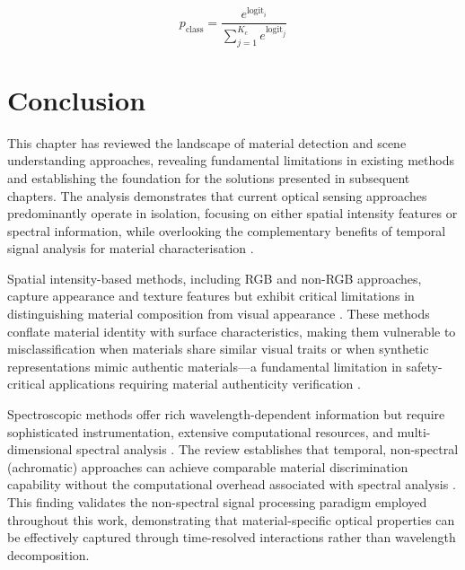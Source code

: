 \documentclass[12pt,a4paper,oneside]{report}
\let\oldsection\section
\renewcommand{\section}{\clearpage\oldsection}
\begin{document}
\begin{equation}
\label{eq:softmax}
p_{\text{class}} = \frac{e^{\text{logit}_{i}}}{\sum_{j=1}^{K_c} e^{\text{logit}_{j}}}
\end{equation}

\newpage
\section{Conclusion}
\label{sec:conclusion_chapter2}

This chapter has reviewed the landscape of material detection and scene understanding approaches, revealing fundamental limitations in existing methods and establishing the foundation for the solutions presented in subsequent chapters. The analysis demonstrates that current optical sensing approaches predominantly operate in isolation, focusing on either spatial intensity features or spectral information, while overlooking the complementary benefits of temporal signal analysis for material characterisation \cite{schwartz2013,sharan2013,su2016,becker2023}.

Spatial intensity-based methods, including RGB and non-RGB approaches, capture appearance and texture features but exhibit critical limitations in distinguishing material composition from visual appearance \cite{schwartz2013,sharan2013,chen2024}. These methods conflate material identity with surface characteristics, making them vulnerable to misclassification when materials share similar visual traits or when synthetic representations mimic authentic materials—a fundamental limitation in safety-critical applications requiring material authenticity verification \cite{su2016,becker2023,yang2024}.

Spectroscopic methods offer rich wavelength-dependent information but require sophisticated instrumentation, extensive computational resources, and multi-dimensional spectral analysis \cite{holt2016,elachi2021,heinz2001,vasile2023}. The review establishes that temporal, non-spectral (achromatic) approaches can achieve comparable material discrimination capability without the computational overhead associated with spectral analysis \cite{su2016,becker2023,tafone2023}. This finding validates the non-spectral signal processing paradigm employed throughout this work, demonstrating that material-specific optical properties can be effectively captured through time-resolved interactions rather than wavelength decomposition.
\end{document}

